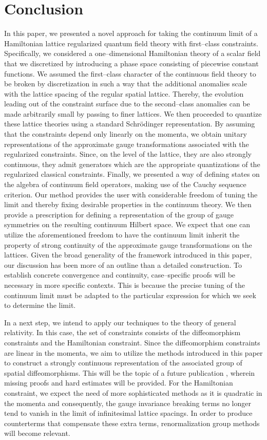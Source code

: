 \section{Conclusion} \label{sec:Conclusion}
In this paper, we presented a novel approach for taking the continuum limit of a Hamiltonian lattice regularized quantum field theory with first--class constraints.
Specifically, we considered a one--dimensional Hamiltonian theory of a scalar field that we discretized by introducing a phase space consisting of piecewise constant functions.
We assumed the first--class character of the continuous field theory to be broken by discretization in such a way that the additional anomalies scale with the lattice spacing of the regular spatial lattice.
Thereby, the evolution leading out of the constraint surface due to the second--class anomalies can be made arbitrarily small by passing to finer lattices.
We then proceeded to quantize these lattice theories using a standard Schrödinger representation.
By assuming that the constraints depend only linearly on the momenta, we obtain unitary representations of the approximate gauge transformations associated with the regularized constraints.
Since, on the level of the lattice, they are also strongly continuous, they admit generators which are the appropriate quantizations of the regularized classical constraints.
Finally, we presented a way of defining states on the algebra of continuum field operators, making use of the Cauchy sequence criterion.
Our method provides the user with considerable freedom of tuning the limit and thereby fixing desirable properties in the continuum theory.
We then provide a prescription for defining a representation of the group of gauge symmetries on the resulting continuum Hilbert space.
We expect that one can utilize the aforementioned freedom to have the continuum limit inherit the property of strong continuity of the approximate gauge transformations on the lattices.
Given the broad generality of the framework introduced in this paper, our discussion has been more of an outline than a detailed construction.
To establish concrete convergence and continuity, case--specific proofs will be necessary in more specific contexts. 
This is because the precise tuning of the continuum limit must be adapted to the particular expression for which we seek to determine the limit. 

In a next step, we intend to apply our techniques to the theory of general relativity.
In this case, the set of constraints consists of the diffeomorphism constraints and the Hamiltonian constraint.
Since the diffeomorphism constraints are linear in the momenta, we aim to utilize the methods introduced in this paper to construct a strongly continuous representation of the associated group of spatial diffeomorphisms.
This will be the topic of a future publication \parencite{gravity-continuum}, wherein missing proofs and hard estimates will be provided.
For the Hamiltonian constraint, we expect the need of more sophisticated methods as it is quadratic in the momenta and consequently, the gauge invariance breaking terms no longer tend to vanish in the limit of infinitesimal lattice spacings.
In order to produce counterterms that compensate these extra terms, renormalization group methods will become relevant.


